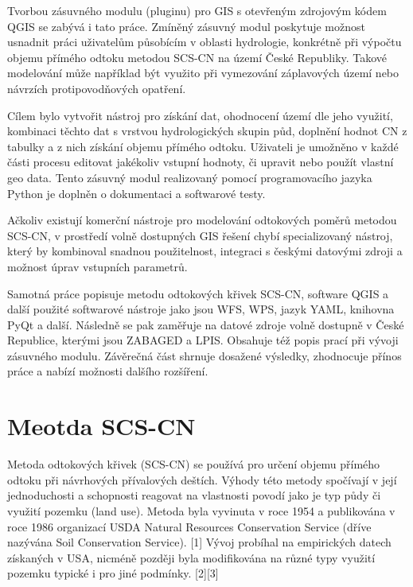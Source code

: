 \documentclass[a4paper,oneside,12pt]{book}
\begin{document}
Tvorbou zásuvného modulu (pluginu) pro GIS s otevřeným zdrojovým kódem QGIS se zabývá i tato práce. Zmíněný zásuvný modul poskytuje možnost usnadnit práci uživatelům působícím v oblasti hydrologie, konkrétně při výpočtu objemu přímého odtoku metodou SCS-CN na území České Republiky. Takové modelování může například být využito při vymezování záplavových území nebo návrzích protipovodňových opatření.

Cílem bylo vytvořit nástroj pro získání dat, ohodnocení území dle jeho využití, kombinaci těchto dat s vrstvou hydrologických skupin půd, doplnění hodnot CN z tabulky a z nich získání objemu přímého odtoku. Uživateli je umožněno v každé části procesu editovat jakékoliv vstupní hodnoty, či upravit nebo použít vlastní geo data. Tento zásuvný modul realizovaný pomocí programovacího jazyka Python je doplněn o dokumentaci a softwarové testy. 

Ačkoliv existují komerční nástroje pro modelování odtokových poměrů metodou SCS-CN, v prostředí volně dostupných GIS řešení chybí specializovaný nástroj, který by kombinoval snadnou použitelnost, integraci s českými datovými zdroji a možnost úprav vstupních parametrů.

Samotná práce popisuje metodu odtokových křivek SCS-CN, software QGIS a další použité softwarové nástroje jako jsou WFS, WPS, jazyk YAML, knihovna PyQt a další. Následně se pak zaměřuje na  datové zdroje volně dostupně v České Republice, kterými jsou ZABAGED a LPIS. Obsahuje též popis prací při vývoji zásuvného modulu. Závěrečná část shrnuje dosažené výsledky, zhodnocuje přínos práce a nabízí možnosti dalšího rozšíření.



\newpage
\chapter{Meotda SCS-CN} \label{SCSCN}
\hspace{10mm} Metoda odtokových křivek (SCS-CN) se používá pro určení objemu přímého odtoku při návrhových přívalových deštích. Výhody této metody spočívají v její jednoduchosti a schopnosti reagovat na vlastnosti povodí jako je typ půdy či využití pozemku (land use). Metoda byla vyvinuta v roce 1954 a publikována v roce 1986 organizací USDA Natural Resources Conservation Service (dříve nazývána Soil Conservation Service). [1] Vývoj probíhal na empirických datech získaných v USA, nicméně později byla modifikována na různé typy využití pozemku typické i pro jiné podmínky. [2][3]
\end{document}
